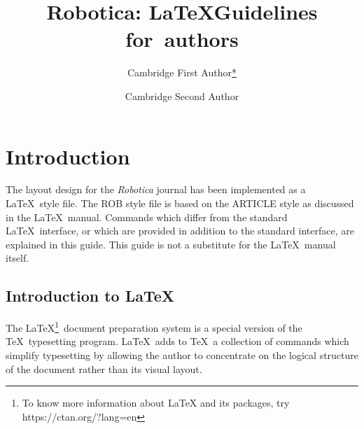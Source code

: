 \documentclass[DTMColor]{ROB-New}
\begin{document}



\title{Robotica: \LaTeX Guidelines for~authors}

\author[1]{Cambridge First Author\hyperlink{corr}{*}}
\address[1]{Electronic Products and Composition Group, Printing Division, Cambridge University Press, CB2 2BS}

\author[2]{Cambridge Second Author}
\address[2]{Department of Innovation Engineering, University of Salento - ISME node - Lecce, Italy.}
\address{\hypertarget{corr}{*}Corresponding author. }




\maketitle

\section{Introduction}

The layout design for the {\em Robotica} journal
has been implemented as a \LaTeX\ style file. The ROB style file is based
on the ARTICLE style as discussed in the \LaTeX\ manual. Commands which
differ from the standard \LaTeX\ interface, or which are provided in addition
to the standard interface, are explained in this guide. This guide is not a
substitute for the \LaTeX\ manual itself.

\subsection{Introduction to \LaTeX}

The \LaTeX\footnote{To know more information about LaTeX and its packages, try https://ctan.org/?lang=en}\ document preparation system is a special version of the
\TeX\ typesetting program. \LaTeX\ adds to \TeX\ a collection of
commands which simplify typesetting by allowing the author to
concentrate on the logical structure of the document rather than
its visual layout.
\end{document}
